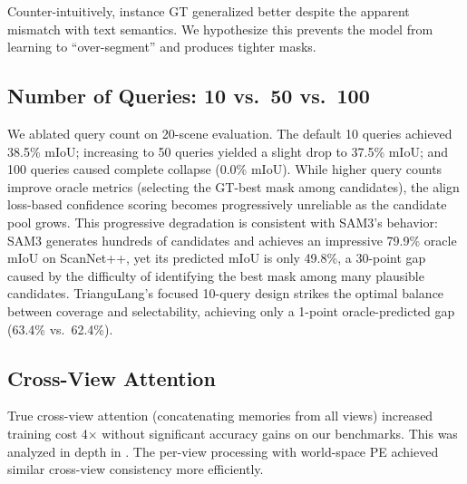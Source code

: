 Counter-intuitively, instance GT generalized better despite the apparent mismatch with text semantics. We hypothesize this prevents the model from learning to ``over-segment'' and produces tighter masks.



\subsection{Number of Queries: 10 vs.\ 50 vs.\ 100}

We ablated query count on 20-scene evaluation. The default 10 queries achieved 38.5\% mIoU; increasing to 50 queries yielded a slight drop to 37.5\% mIoU; and 100 queries caused complete collapse (0.0\% mIoU). While higher query counts improve oracle metrics (selecting the GT-best mask among candidates), the align loss-based confidence scoring becomes progressively unreliable as the candidate pool grows. This progressive degradation is consistent with SAM3's behavior: SAM3 generates hundreds of candidates and achieves an impressive 79.9\% oracle mIoU on ScanNet++, yet its predicted mIoU is only 49.8\%, a 30-point gap caused by the difficulty of identifying the best mask among many plausible candidates. TrianguLang's focused 10-query design strikes the optimal balance between coverage and selectability, achieving only a 1-point oracle-predicted gap (63.4\% vs.\ 62.4\%).

\subsection{Cross-View Attention}

True cross-view attention (concatenating memories from all views) increased training cost 4$\times$ without significant accuracy gains on our benchmarks. This was analyzed in depth in \cite{mvsam}. The per-view processing with world-space PE achieved similar cross-view consistency more efficiently.

